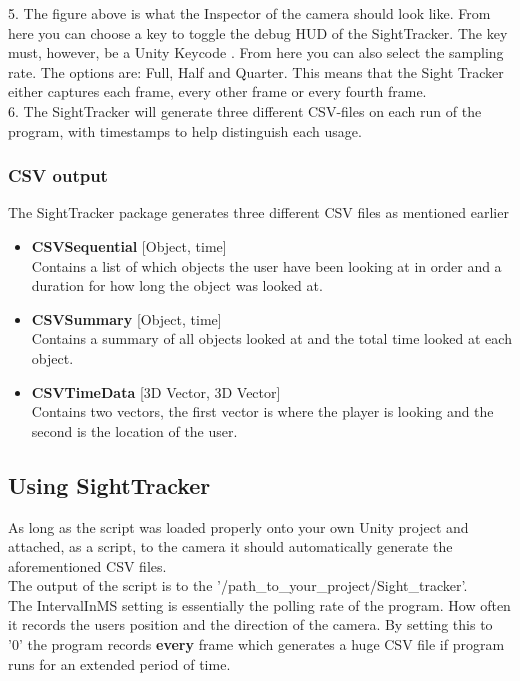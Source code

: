 \documentclass[letterpaper]{article}
\begin{document}
\begin{itemize}
5. The figure above is what the Inspector of the camera should look like. From here you can choose a key to toggle the debug HUD of the SightTracker. The key must, however, be a Unity Keycode \cite{unitykeycode}. From here you can also select the sampling rate. The options are: Full, Half and Quarter. This means that the Sight Tracker either captures each frame, every other frame or every fourth frame.\\[0.15in]
6. The SightTracker will generate three different CSV-files on each run of the program, with timestamps to help distinguish each usage.
\end{itemize}
\subsubsection{CSV output}
The SightTracker package generates three different CSV files as mentioned earlier\\
\begin{itemize}
\item \textbf{CSVSequential} [Object, time]\\
Contains a list of which objects the user have been looking at in order and a duration for how long the object was looked at.
\item \textbf{CSVSummary} [Object, time]\\
Contains a summary of all objects looked at and the total time looked at each object.
\item \textbf{CSVTimeData} [3D Vector, 3D Vector]\\
Contains two vectors, the first vector is where the player is looking and the second is the location of the user.
\end{itemize}
\pagebreak
\subsection{Using SightTracker}
As long as the script was loaded properly onto your own Unity project and attached, as a script, to the camera it should automatically generate the aforementioned CSV files.\\
The output of the script is to the '/path\_to\_your\_project/Sight\_tracker'.\\
The IntervalInMS setting is essentially the polling rate of the program. How often it records the users position and the direction of the camera. By setting this to '0' the program records \textbf{every} frame which generates a huge CSV file if program runs for an extended period of time.
\end{document}
